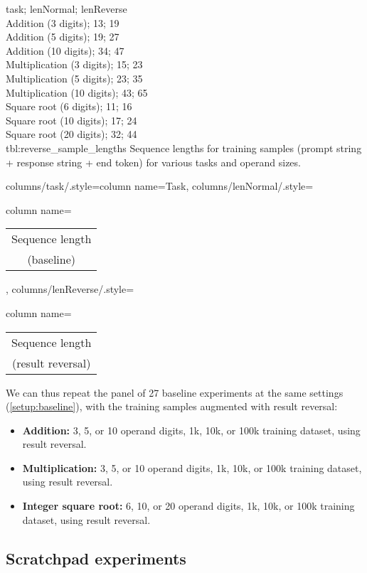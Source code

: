 {
	task; lenNormal; lenReverse\\
	Addition (3 digits); 13; 19 \\
	Addition (5 digits); 19; 27 \\
	Addition (10 digits); 34; 47 \\
	Multiplication (3 digits); 15; 23 \\
	Multiplication (5 digits); 23; 35 \\
	Multiplication (10 digits); 43; 65 \\
	Square root (6 digits); 11; 16 \\
	Square root (10 digits); 17; 24 \\
	Square root (20 digits); 32; 44 \\
}
{tbl:reverse_sample_lengths}
{
	Sequence lengths for training samples (prompt string + response string + end token) for various tasks and operand sizes.
}
{%
	columns/task/.style={column name={Task}},
	columns/lenNormal/.style={column name={\begin{tabular}{c} Sequence length \\ (baseline) \\ \end{tabular}}},
	columns/lenReverse/.style={column name={\begin{tabular}{c} Sequence length \\ (result reversal) \\ \end{tabular}}}
}



We can thus repeat the panel of 27 baseline experiments at the same settings (\cref{setup:baseline}), with the training samples augmented with result reversal:


\begin{itemize}
	\item \textbf{Addition:} 3, 5, or 10 operand digits, 1k, 10k, or 100k training dataset, using result reversal.
	\item \textbf{Multiplication:} 3, 5, or 10 operand digits, 1k, 10k, or 100k training dataset, using result reversal.
	\item \textbf{Integer square root:} 6, 10, or 20 operand digits, 1k, 10k, or 100k training dataset, using result reversal.
\end{itemize}

\subsection{Scratchpad experiments}
\label{setup:scratchpad}

